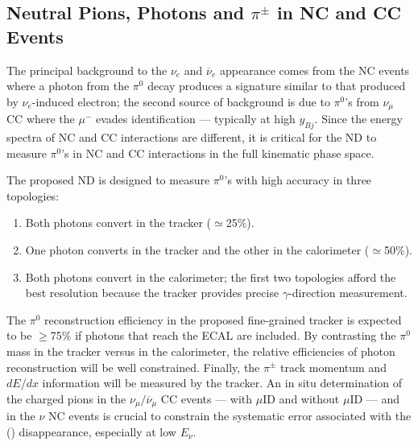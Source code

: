 \subsection{Neutral Pions, Photons and $\pi^{\pm}$ in NC and CC Events}

\label{sec-bkgnds}
The principal background to the $\nu_e$ and $\overline{\nu}_e$
appearance comes from the NC events where a photon from the $\pi^0$
decay produces a signature similar to that produced by $\nu_e$-induced
electron; the second source of background is due to $\pi^0$'s from
$\nu_\mu$ CC where the $\mu^-$ evades identification --- typically at
high $y_{Bj}$.  Since the energy spectra of NC and CC interactions are
different, it is critical for the ND to measure $\pi^0$'s in NC and CC
interactions in the full kinematic phase space.
 
The proposed ND is designed to measure $\pi^0$'s with 
high accuracy in three topologies: 
\begin{enumerate}
\item Both photons convert 
in the tracker ($\simeq$25\%).
\item One photon converts  
in the tracker and the other in the calorimeter ($\simeq$50\%). 
\item Both photons convert in the calorimeter;  
the first two topologies afford the best resolution 
because the tracker provides precise $\gamma$-direction measurement. 
\end{enumerate}
The $\pi^0$ reconstruction efficiency in the proposed fine-grained tracker is
expected to be $\geq$75\% if photons that reach the ECAL are
included.   By contrasting the $\pi^0$ mass  in the tracker
versus in the calorimeter, the relative efficiencies 
of photon reconstruction will be well constrained. 
Finally, the $\pi^{\pm}$ track momentum and $dE/dx$ information will
be measured by the tracker.  An in situ determination of the charged
pions in the $\nu_{\mu}/\overline{\nu}_\mu$ CC events --- with $\mu$ID and
without $\mu$ID --- and in the $\nu$ NC events is crucial to constrain
the systematic error associated with the \numu (\anumu) disappearance,
especially at low $E_\nu$.
